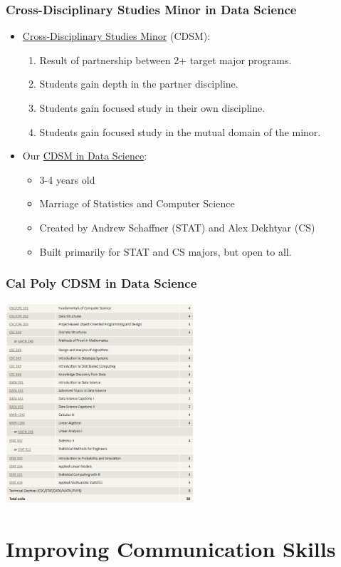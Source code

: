 \documentclass[xcolor={dvipsnames}]{beamer}
\newcommand{\ft}{\frametitle}
\newcommand{\bi}{\begin{itemize}}
\newcommand{\be}{\begin{enumerate}}
\newcommand{\ei}{\end{itemize}}
\newcommand{\ee}{\end{enumerate}}
\begin{document}
\begin{frame}
\ft{Cross-Disciplinary Studies Minor in Data Science}
\pause
\bi
	\item \href{https://academicprograms.calpoly.edu/content/academicpolicies/policies-Undergrad/cross-disciplinary-studies-minors}{Cross-Disciplinary Studies Minor} (CDSM):
		\be
			\item Result of partnership between 2+ target major programs.
			\pause
			\item Students gain depth in the partner discipline.
			\pause
			\item Students gain focused study in their own discipline.
			\pause
			\item Students gain focused study in the mutual domain of the minor.
		\ee
	\pause
	\item Our \href{https://statistics.calpoly.edu/data-science-minor}{CDSM in Data Science}:
		\bi
			\item 3-4 years old
			\item Marriage of Statistics and Computer Science
			\item Created by Andrew Schaffner (STAT) and Alex Dekhtyar (CS)
			\item Built primarily for STAT and CS majors, but open to all.
		\ei
\ei
\end{frame}

\begin{frame}
\ft{Cal Poly CDSM in Data Science}
\begin{center}
	\includegraphics[width = 2.75in]{CP-DS-CDSM-form.png}
\end{center}

\end{frame}

\section{Improving Communication Skills}
\end{document}
